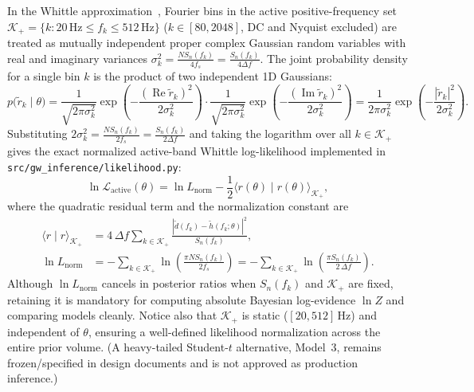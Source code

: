 \documentclass[11pt,a4paper]{report}
\begin{document}
In the Whittle approximation~\cite{Finn1992}, Fourier bins in the active positive-frequency set $\mathcal{K}_+ = \{k : 20\,\mathrm{Hz} \le f_k \le 512\,\mathrm{Hz}\}$ ($k \in [80, 2048]$, DC and Nyquist excluded) are treated as mutually independent proper complex Gaussian random variables with real and imaginary variances $\sigma_k^2 = \frac{N S_n(f_k)}{4 f_s} = \frac{S_n(f_k)}{4\Delta f}$. The joint probability density for a single bin $k$ is the product of two independent 1D Gaussians:
\begin{equation}
p\big(\tilde{r}_k \mid \theta\big) = \frac{1}{\sqrt{2\pi \sigma_k^2}} \exp\!\left(-\frac{(\operatorname{Re}\tilde{r}_k)^2}{2\sigma_k^2}\right) \cdot \frac{1}{\sqrt{2\pi \sigma_k^2}} \exp\!\left(-\frac{(\operatorname{Im}\tilde{r}_k)^2}{2\sigma_k^2}\right) = \frac{1}{2\pi \sigma_k^2}\exp\!\left(-\frac{|\tilde{r}_k|^2}{2\sigma_k^2}\right).
\end{equation}
Substituting $2\sigma_k^2 = \frac{N S_n(f_k)}{2 f_s} = \frac{S_n(f_k)}{2\Delta f}$ and taking the logarithm over all $k \in \mathcal{K}_+$ gives the exact normalized active-band Whittle log-likelihood implemented in \texttt{src/gw\_inference/likelihood.py}:
\begin{equation}
\ln \mathcal{L}_{\mathrm{active}}(\theta) = \ln L_{\mathrm{norm}} - \frac{1}{2}\langle r(\theta) \mid r(\theta) \rangle_{\mathcal{K}_+},
\end{equation}
where the quadratic residual term and the normalization constant are
\begin{align}
\langle r \mid r \rangle_{\mathcal{K}_+} &= 4\,\Delta f \sum_{k \in \mathcal{K}_+} \frac{|\tilde{d}(f_k) - \tilde{h}(f_k; \theta)|^2}{S_n(f_k)}, \\
\ln L_{\mathrm{norm}} &= -\sum_{k \in \mathcal{K}_+} \ln\!\left(\frac{\pi N S_n(f_k)}{2 f_s}\right) = -\sum_{k \in \mathcal{K}_+} \ln\!\left(\frac{\pi S_n(f_k)}{2\,\Delta f}\right).
\end{align}
Although $\ln L_{\mathrm{norm}}$ cancels in posterior ratios when $S_n(f_k)$ and $\mathcal{K}_+$ are fixed, retaining it is mandatory for computing absolute Bayesian log-evidence $\ln Z$ and comparing models cleanly. Notice also that $\mathcal{K}_+$ is static ($[20, 512]\,\mathrm{Hz}$) and independent of $\theta$, ensuring a well-defined likelihood normalization across the entire prior volume. (A heavy-tailed Student-$t$ alternative, Model~3, remains frozen/specified in design documents and is not approved as production inference.)

\end{document}

